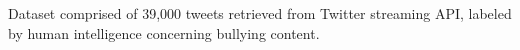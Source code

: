 Dataset comprised of 39,000 tweets retrieved from Twitter streaming API, labeled by human intelligence concerning bullying content.
